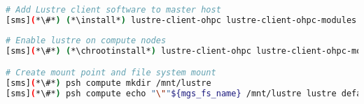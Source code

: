 
\begin{lstlisting}[language=bash,keywords={},upquote=true]
# Add Lustre client software to master host
[sms](*\#*) (*\install*) lustre-client-ohpc lustre-client-ohpc-modules
\end{lstlisting}

\begin{lstlisting}[language=bash,keywords={},upquote=true]
# Enable lustre on compute nodes
[sms](*\#*) (*\chrootinstall*) lustre-client-ohpc lustre-client-ohpc-modules

# Create mount point and file system mount
[sms](*\#*) psh compute mkdir /mnt/lustre
[sms](*\#*) psh compute echo "\""${mgs_fs_name} /mnt/lustre lustre defaults,_netdev,localflock,retry=2 0 0"\"" \>\> /etc/fstab
\end{lstlisting}
